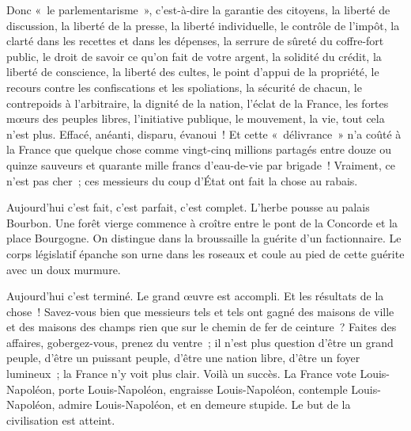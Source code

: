 \documentclass[french,twoside]{book} %
\begin{document}
\noindent Donc « le parlementarisme », c’est-à-dire la garantie des citoyens, la liberté de discussion, la liberté de la presse, la liberté individuelle, le contrôle de l’impôt, la clarté dans les recettes et dans les dépenses, la serrure de sûreté du coffre-fort public, le droit de savoir ce qu’on fait de votre argent, la solidité du crédit, la liberté de conscience, la liberté des cultes, le point d’appui de la propriété, le recours contre les confiscations et les spoliations, la sécurité de chacun, le contrepoids à l’arbitraire, la dignité de la nation, l’éclat de la France, les fortes mœurs des peuples libres, l’initiative publique, le mouvement, la vie, tout cela n’est plus. Effacé, anéanti, disparu, évanoui ! Et cette « délivrance » n’a coûté à la France que quelque chose comme vingt-cinq millions partagés entre douze ou quinze sauveurs et quarante mille francs d’eau-de-vie par brigade ! Vraiment, ce n’est pas cher ; ces messieurs du coup d’État ont fait la chose au rabais.\par
Aujourd’hui c’est fait, c’est parfait, c’est complet. L’herbe pousse au palais Bourbon. Une forêt vierge commence à croître entre le pont de la Concorde et la place Bourgogne. On distingue dans la broussaille la guérite d’un factionnaire. Le corps législatif épanche son urne dans les roseaux et coule au pied de cette guérite avec un doux murmure.\par
Aujourd’hui c’est terminé. Le grand œuvre est accompli. Et les résultats de la chose ! Savez-vous bien que messieurs tels et tels ont gagné des maisons de ville et des maisons des champs rien que sur le chemin de fer de ceinture ? Faites des affaires, gobergez-vous, prenez du ventre ; il n’est plus question d’être un grand peuple, d’être un puissant peuple, d’être une nation libre, d’être un foyer lumineux ; la France n’y voit plus clair. Voilà un succès. La France vote Louis-Napoléon, porte Louis-Napoléon, engraisse Louis-Napoléon, contemple Louis-Napoléon, admire Louis-Napoléon, et en demeure stupide. Le but de la civilisation est atteint.\par
\end{document}
